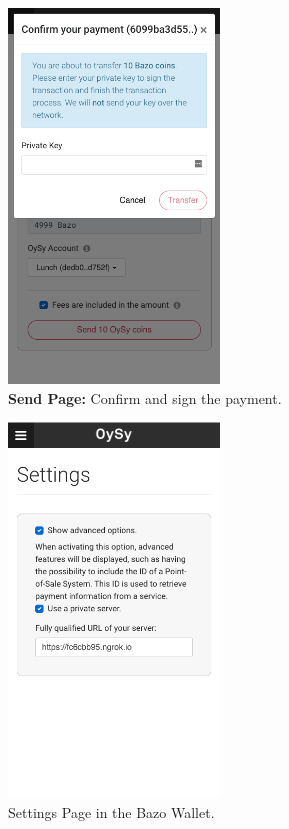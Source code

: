 \begin{figure}
\centering
\includegraphics[width=0.5\textwidth]{screenshots/Send-2.png}
\caption{\label{fig:uisend2}\textbf{Send Page:} Confirm and sign the payment.}
\end{figure}

\begin{figure}
\centering
\includegraphics[width=0.5\textwidth]{screenshots/Settings.png}
\caption{\label{fig:uisettings}Settings Page in the Bazo Wallet.}
\end{figure}


